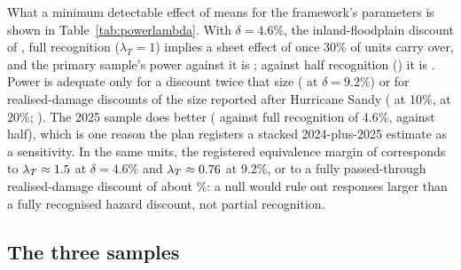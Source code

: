 \begin{table}[t]
\centering\footnotesize
\caption{Power against the effects the framework implies}\label{tab:powerlambda}

\end{table}

What a minimum detectable effect of \regMdePooled{} means for the framework's parameters is shown in Table~\ref{tab:powerlambda}. With $\delta = 4.6\%$, the inland-floodplain discount of \citet{beltran2018flood}, full recognition ($\lambda_T = 1$) implies a sheet effect of \effFullMid{} once 30\% of units carry over, and the primary sample's power against it is \powFullMid; against half recognition (\effHalfMid) it is \powHalfMid. Power is adequate only for a discount twice that size (\powFullHigh{} at $\delta = 9.2\%$) or for realised-damage discounts of the size reported after Hurricane Sandy (\powDamageTen{} at 10\%, \powDamageTwenty{} at 20\%; \citealp{ortega2018rising,guo2026rising}). The 2025 sample does better (\powFullMidEv{} against full recognition of 4.6\%, \powHalfMidEv{} against half), which is one reason the plan registers a stacked 2024-plus-2025 estimate as a sensitivity. In the same units, the registered equivalence margin of \radarEquiv{} corresponds to $\lambda_T \approx 1.5$ at $\delta = 4.6\%$ and $\lambda_T \approx 0.76$ at $9.2\%$, or to a fully passed-through realised-damage discount of about \equivDamage\%: a null would rule out responses larger than a fully recognised hazard discount, not partial recognition.

\subsection{The three samples}\label{sec:samples}


